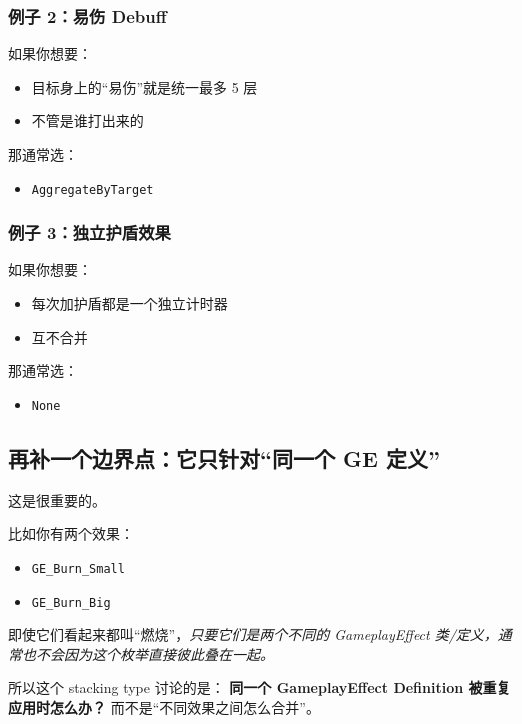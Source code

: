 \subsubsection*{例子 2：易伤 Debuff}
如果你想要：

\begin{itemize}
	\item 目标身上的“易伤”就是统一最多 5 层
	\item 不管是谁打出来的
\end{itemize}

那通常选：

\begin{itemize}
	\item \texttt{AggregateByTarget}
\end{itemize}

\subsubsection*{例子 3：独立护盾效果}
如果你想要：

\begin{itemize}
	\item 每次加护盾都是一个独立计时器
	\item 互不合并
\end{itemize}

那通常选：

\begin{itemize}
	\item \texttt{None}
\end{itemize}

\subsection{再补一个边界点：它只针对“同一个 GE 定义”}

这是很重要的。

比如你有两个效果：

\begin{itemize}
	\item \texttt{GE\_Burn\_Small}
	\item \texttt{GE\_Burn\_Big}
\end{itemize}

即使它们看起来都叫“燃烧”，\emph{只要它们是两个不同的 GameplayEffect 类/定义，通常也不会因为这个枚举直接彼此叠在一起。}

所以这个 stacking type 讨论的是：	\textbf{同一个 GameplayEffect Definition 被重复应用时怎么办？} 而不是“不同效果之间怎么合并”。

